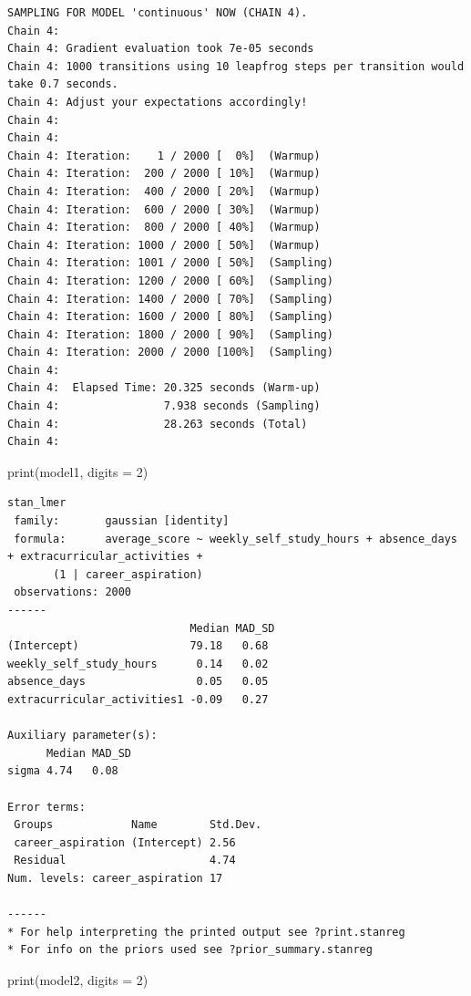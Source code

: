 \documentclass[
  letterpaper,
  DIV=11,
  numbers=noendperiod]{scrartcl}
\newenvironment{Shaded}{\begin{snugshade}}{\end{snugshade}}
\newcommand{\AttributeTok}[1]{\textcolor[rgb]{0.40,0.45,0.13}{#1}}
\newcommand{\DecValTok}[1]{\textcolor[rgb]{0.68,0.00,0.00}{#1}}
\newcommand{\FunctionTok}[1]{\textcolor[rgb]{0.28,0.35,0.67}{#1}}
\newcommand{\NormalTok}[1]{\textcolor[rgb]{0.00,0.23,0.31}{#1}}
\begin{document}
\begin{verbatim}
SAMPLING FOR MODEL 'continuous' NOW (CHAIN 4).
Chain 4: 
Chain 4: Gradient evaluation took 7e-05 seconds
Chain 4: 1000 transitions using 10 leapfrog steps per transition would take 0.7 seconds.
Chain 4: Adjust your expectations accordingly!
Chain 4: 
Chain 4: 
Chain 4: Iteration:    1 / 2000 [  0%]  (Warmup)
Chain 4: Iteration:  200 / 2000 [ 10%]  (Warmup)
Chain 4: Iteration:  400 / 2000 [ 20%]  (Warmup)
Chain 4: Iteration:  600 / 2000 [ 30%]  (Warmup)
Chain 4: Iteration:  800 / 2000 [ 40%]  (Warmup)
Chain 4: Iteration: 1000 / 2000 [ 50%]  (Warmup)
Chain 4: Iteration: 1001 / 2000 [ 50%]  (Sampling)
Chain 4: Iteration: 1200 / 2000 [ 60%]  (Sampling)
Chain 4: Iteration: 1400 / 2000 [ 70%]  (Sampling)
Chain 4: Iteration: 1600 / 2000 [ 80%]  (Sampling)
Chain 4: Iteration: 1800 / 2000 [ 90%]  (Sampling)
Chain 4: Iteration: 2000 / 2000 [100%]  (Sampling)
Chain 4: 
Chain 4:  Elapsed Time: 20.325 seconds (Warm-up)
Chain 4:                7.938 seconds (Sampling)
Chain 4:                28.263 seconds (Total)
Chain 4: 
\end{verbatim}

\begin{Shaded}
\begin{Highlighting}[]
\FunctionTok{print}\NormalTok{(model1, }\AttributeTok{digits =} \DecValTok{2}\NormalTok{)}
\end{Highlighting}
\end{Shaded}

\begin{verbatim}
stan_lmer
 family:       gaussian [identity]
 formula:      average_score ~ weekly_self_study_hours + absence_days + extracurricular_activities + 
       (1 | career_aspiration)
 observations: 2000
------
                            Median MAD_SD
(Intercept)                 79.18   0.68 
weekly_self_study_hours      0.14   0.02 
absence_days                 0.05   0.05 
extracurricular_activities1 -0.09   0.27 

Auxiliary parameter(s):
      Median MAD_SD
sigma 4.74   0.08  

Error terms:
 Groups            Name        Std.Dev.
 career_aspiration (Intercept) 2.56    
 Residual                      4.74    
Num. levels: career_aspiration 17 

------
* For help interpreting the printed output see ?print.stanreg
* For info on the priors used see ?prior_summary.stanreg
\end{verbatim}

\begin{Shaded}
\begin{Highlighting}[]
\FunctionTok{print}\NormalTok{(model2, }\AttributeTok{digits =} \DecValTok{2}\NormalTok{)}
\end{Highlighting}
\end{Shaded}
\end{document}
